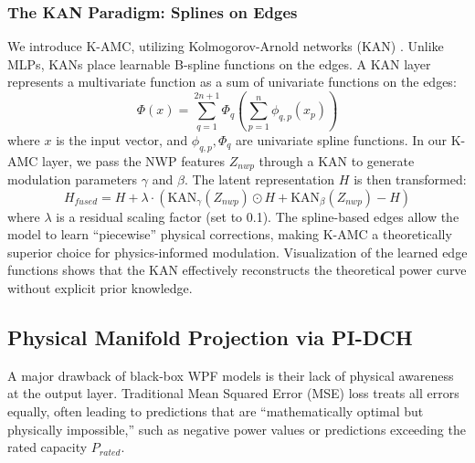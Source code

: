 \subsubsection{The KAN Paradigm: Splines on Edges}
\label{sec:kan_advantage}
We introduce K-AMC, utilizing Kolmogorov-Arnold networks (KAN) \cite{liu2024kan}. Unlike MLPs, KANs place learnable B-spline functions on the edges. A KAN layer represents a multivariate function as a sum of univariate functions on the edges:
\begin{equation}
\Phi(x) = \sum_{q=1}^{2n+1} \Phi_q \left( \sum_{p=1}^n \phi_{q, p}(x_p) \right)
\end{equation}
where $x$ is the input vector, and $\phi_{q,p}, \Phi_q$ are univariate spline functions. In our K-AMC layer, we pass the NWP features $Z_{nwp}$ through a KAN to generate modulation parameters $\gamma$ and $\beta$. The latent representation $H$ is then transformed:
\begin{equation}
H_{fused} = H + \lambda \cdot (\text{KAN}_{\gamma}(Z_{nwp}) \odot H + \text{KAN}_{\beta}(Z_{nwp}) - H)
\end{equation}
where $\lambda$ is a residual scaling factor (set to 0.1). The spline-based edges allow the model to learn ``piecewise'' physical corrections, making K-AMC a theoretically superior choice for physics-informed modulation. Visualization of the learned edge functions shows that the KAN effectively reconstructs the theoretical power curve without explicit prior knowledge.

\subsection{Physical Manifold Projection via PI-DCH}
\label{sec:pidch}
A major drawback of black-box WPF models is their lack of physical awareness at the output layer. Traditional Mean Squared Error (MSE) loss treats all errors equally, often leading to predictions that are ``mathematically optimal but physically impossible,'' such as negative power values or predictions exceeding the rated capacity $P_{rated}$. 

